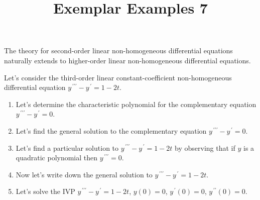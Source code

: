 \documentclass{ximera}
\begin{document}
\begin{abstract}
 \end{abstract}

    \title{Exemplar Examples 7}
    
    \maketitle


The theory for second-order linear non-homogeneous differential equations naturally extends to higher-order linear non-homogeneous differential equations.


Let's consider the third-order linear constant-coefficient non-homogeneous differential equation $y^{\,\prime\prime\prime}-y^{\,\prime}=1-2t$.

\begin{enumerate}
  \item  Let's determine the characteristic polynomial for the complementary equation $y^{\,\prime\prime\prime}-y^{\,\prime}=0$.


\vfill


\item Let's find the general solution to the complementary equation $y^{\,\prime\prime\prime}-y^{\,\prime}=0$.



\vfill
\vfill

\item Let's find a particular solution to $y^{\,\prime\prime\prime}-y^{\,\prime}=1-2t$ by observing that if $y$ is a quadratic polynomial then $y^{\,\prime\prime\prime}=0$.


\vfill

\newpage

\item Now let's write down the general solution to $y^{\,\prime\prime\prime}-y^{\,\prime}=1-2t$.



\vfill

\item Let's solve the IVP $y^{\,\prime\prime\prime}-y^{\,\prime}=1-2t$, $y(0)=0$, $y^{\,\prime}(0)=0$, $y^{\,\prime\prime}(0)=0$.








\vfill
\vfill



\end{enumerate}
\end{document}
